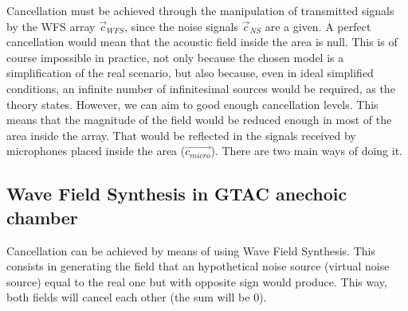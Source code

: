 %
%

Cancellation must be achieved through the manipulation of transmitted signals by the WFS array $\vec{c}_\mathit{WFS}$, since the noise signals $\vec{c}_{\mathit{NS}}$ are a given. A perfect cancellation would mean that the acoustic field inside the area is null. This is of course impossible in practice, not only because the chosen model is a simplification of the real scenario, but also because, even in ideal simplified conditions, an infinite number of infinitesimal sources would be required, as the theory states. However, we can aim to good enough cancellation levels. This means that the magnitude of the field would be reduced enough in most of the area inside the array. That would be reflected in the signals received by microphones placed inside the area ($\vec{c_\mathit{micro}}$). There are two main ways of doing it.

\subsection{Wave Field Synthesis in GTAC anechoic chamber} \label{WFSexplanation}
Cancellation can be achieved by means of using Wave Field Synthesis. This consists in generating the field that an hypothetical noise source (virtual noise source) equal to the real one but with opposite sign would produce. This way, both fields will cancel each other (the sum will be $0$).

